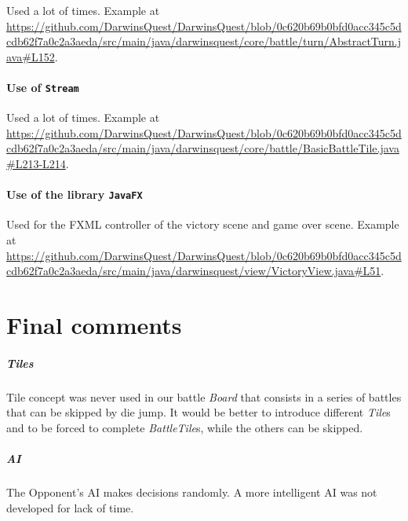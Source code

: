 \documentclass[12pt, a4paper]{report}
\theoremstyle{definition}
\begin{document}
    Used a lot of times.
    Example at \url{https://github.com/DarwinsQuest/DarwinsQuest/blob/0c620b69b0bfd0acc345c5dcdb62f7a0c2a3aeda/src/main/java/darwinsquest/core/battle/turn/AbstractTurn.java#L152}.

    \subsubsection{Use of \texttt{Stream}}

    Used a lot of times.
    Example at \url{https://github.com/DarwinsQuest/DarwinsQuest/blob/0c620b69b0bfd0acc345c5dcdb62f7a0c2a3aeda/src/main/java/darwinsquest/core/battle/BasicBattleTile.java#L213-L214}.

    \subsubsection{Use of the library \texttt{JavaFX}}
    Used for the FXML controller of the victory scene and game over scene.
    Example at \url{https://github.com/DarwinsQuest/DarwinsQuest/blob/0c620b69b0bfd0acc345c5dcdb62f7a0c2a3aeda/src/main/java/darwinsquest/view/VictoryView.java#L51}.


\chapter{Final comments}

    \paragraph{Tiles}
    Tile concept was never used in our battle \emph{Board} that consists in a series of battles that can be skipped by die jump.
    It would be better to introduce different \emph{Tile}s and to be forced to complete \emph{BattleTile}s, while the others can be skipped.

    \paragraph{AI}
    The Opponent's AI makes decisions randomly. A more intelligent AI was not developed for lack of time.
\end{document}
